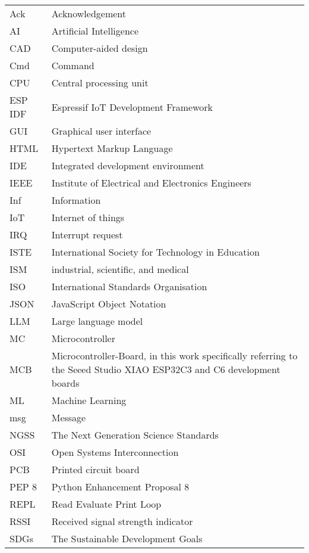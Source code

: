 {\begin{longtable}[h]{@{}p{} @{}p{}@{}}
Ack             & Acknowledgement \\
AI              & Artificial Intelligence \\
CAD				& Computer-aided design \\
Cmd             & Command \\
CPU             & Central processing unit \\
ESP IDF         & Espressif IoT Development Framework \\
GUI             & Graphical user interface \\
HTML            & Hypertext Markup Language \\
IDE             & Integrated development environment \\
IEEE            & Institute of Electrical and Electronics Engineers \\
Inf             & Information \\
IoT             & Internet of things \\
IRQ             & Interrupt request \\
ISTE            & International Society for Technology in Education \\
ISM             & industrial, scientific, and medical \\
ISO             & International Standards Organisation \\
JSON            & JavaScript Object Notation \\
LLM             & Large language model \\
MC              & Microcontroller \\
MCB             & Microcontroller-Board, in this work specifically referring to the Seeed Studio XIAO ESP32C3 and C6 development boards \\
ML              & Machine Learning \\
msg             & Message \\
NGSS            & The Next Generation Science Standards \\
OSI             & Open Systems Interconnection \\
PCB             & Printed circuit board \\
PEP 8           & Python Enhancement Proposal 8 \\
REPL            & Read Evaluate Print Loop \\
RSSI            & Received signal strength indicator \\
SDGs            & The Sustainable Development Goals \\

\end{longtable}}
